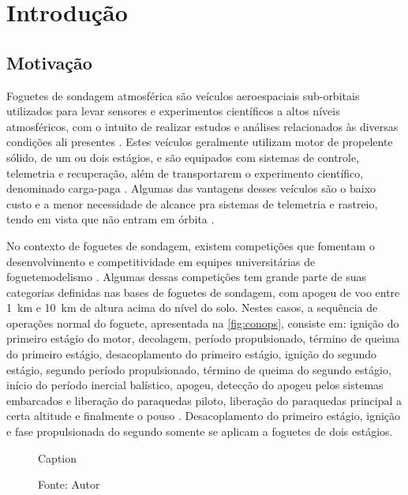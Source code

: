\chapter{Introdução}

\section{Motivação}



Foguetes de sondagem atmosférica são veículos aeroespaciais sub-orbitais utilizados para levar sensores e experimentos científicos a altos níveis atmosféricos, com o intuito de realizar estudos e análises relacionados às diversas condições ali presentes \cite{isro}.
Estes veículos geralmente utilizam motor de propelente sólido, de um ou dois estágios, e são equipados com sistemas de controle, telemetria e recuperação, além de transportarem o experimento científico, denominado carga-paga \cite{esa, sabbatini2014esa}.
Algumas das vantagens desses veículos são o baixo custo e a menor necessidade de alcance pra sistemas de telemetria e rastreio, tendo em vista que não entram em órbita \cite{nasa}.

No contexto de foguetes de sondagem, existem competições que fomentam o desenvolvimento e competitividade em equipes universitárias de foguetemodelismo \cite{esra}.
Algumas dessas competições tem grande parte de suas categorias definidas nas bases de foguetes de sondagem, com apogeu de voo entre \SI{1}{\kilo\metre} e \SI{10}{\kilo\metre} de altura acima do nível do solo.
Nestes casos, a sequência de operações normal do foguete, apresentada na \autoref{fig:conops}, consiste em: ignição do primeiro estágio do motor, decolagem, período propulsionado, término de queima do primeiro estágio, desacoplamento do primeiro estágio, ignição do segundo estágio, segundo período propulsionado, término de queima do segundo estágio, início do período inercial balístico, apogeu, detecção do apogeu pelos sistemas embarcados e liberação do paraquedas piloto, liberação do paraquedas principal a certa altitude e finalmente o pouso \cite{esa, sabbatini2014esa}.
Desacoplamento do primeiro estágio, ignição e fase propulsionada do segundo somente se aplicam a foguetes de dois estágios.

\begin{figure}[h]
    \centering
    \caption{Caption}
    
    \caption*{Fonte: Autor}
    \label{fig:conops}
\end{figure}

